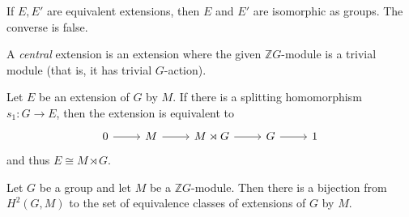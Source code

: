 If \( E, E' \) are equivalent extensions, then \( E \) and \( E' \) are isomorphic as groups.
The converse is false.
\begin{definition}
    A \emph{central} extension is an extension where the given \( \mathbb Z G \)-module is a trivial module (that is, it has trivial \( G \)-action).
\end{definition}
\begin{proposition}
    Let \( E \) be an extension of \( G \) by \( M \).
    If there is a splitting homomorphism \( s_1 : G \to E \), then the extension is equivalent to
    \[\begin{tikzcd}
        0 & M & {M \rtimes G} & G & 1
        \arrow[from=1-1, to=1-2]
        \arrow[from=1-2, to=1-3]
        \arrow[from=1-3, to=1-4]
        \arrow[from=1-4, to=1-5]
    \end{tikzcd}\]
    and thus \( E \cong M \rtimes G \).
\end{proposition}
\begin{theorem}
    Let \( G \) be a group and let \( M \) be a \( \mathbb Z G \)-module.
    Then there is a bijection from \( H^2(G, M) \) to the set of equivalence classes of extensions of \( G \) by \( M \).
\end{theorem}

